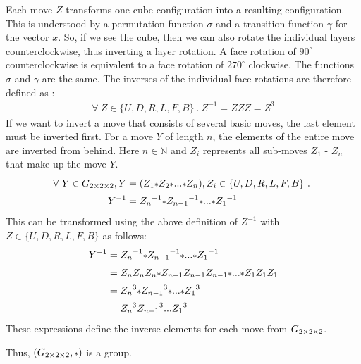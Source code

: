 \begin{description}
Each move $Z$ transforms one cube configuration into a resulting configuration.
This is understood by a permutation function $\sigma$ and a transition function $\gamma$ for the vector $x$.
So, if we see the cube, then we can also rotate the individual layers counterclockwise, thus inverting a layer rotation. A face rotation of $90^\circ$ counterclockwise is equivalent to a face rotation of $270^\circ$ clockwise. The functions $\sigma$ and $\gamma$ are the same.
The inverses of the individual face rotations are therefore defined as :
\begin{align*}
\forall \ Z \in \{U, D, R, L, F, B\} \ . \ Z^{-1} = ZZZ = Z^3
\end{align*}
If we want to invert a move that consists of several basic moves, the last element must be inverted first. For a move $Y$ of length $n$, the elements of the entire move are inverted from behind. Here $n \in \mathbb {N}$ and $Z_i$ represents all sub-moves $Z_1$ - $Z_n$ that make up the move $Y$.
\begin{align*}
\forall \ Y \in \Gtwo, Y & = (Z_1 \mathlarger{\scriptstyle*} Z_2 \mathlarger{\scriptstyle*} ... \mathlarger{\scriptstyle*} Z_n), Z_{i} \in \{U, D, R, L, F, B\} \ . \ \\
Y^{-1} & = {Z_n}^{-1} \mathlarger{\scriptstyle*} {Z_{n-1}}^{-1} \mathlarger{\scriptstyle*} ... \mathlarger{\scriptstyle*} {Z_1}^{-1}
\end{align*}
This can be transformed using the above definition of $Z^{-1}$ with $Z \in \{U, D, R, L, F, B\} $ as follows:
\begin{align*}
Y^{-1} & = {Z_n}^{-1} \mathlarger{\scriptstyle*} {Z_{n-1}}^{-1} \mathlarger{\scriptstyle*} ... \mathlarger{\scriptstyle*} {Z_1}^{-1} \\
& = Z_nZ_nZ_n \mathlarger{\scriptstyle*} Z_{n-1}Z_{n-1}Z_{n-1} \mathlarger{\scriptstyle*} ... \mathlarger{\scriptstyle*} Z_1Z_1Z_1 \\
& = {Z_n}^3 \mathlarger{\scriptstyle*} {Z_{n-1}}^3 \mathlarger{\scriptstyle*} ... \mathlarger{\scriptstyle*} {Z_1}^3 \\
& = {Z_n}^3{Z_{n-1}}^3 ... {Z_1}^3 \\
\end{align*}
These expressions define the inverse elements for each move from $G_{2\times 2\times 2}$.

\end{description}
Thus, $(\Gtwo, \mathlarger{\scriptstyle*})$ is a group. 

